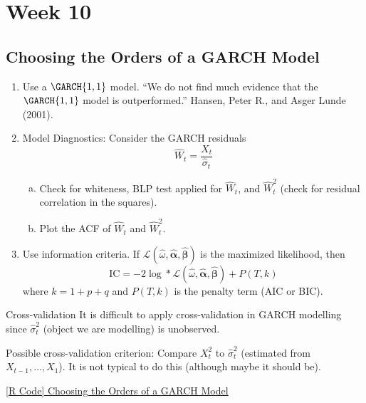 \chapter{Week 10}
\section{Choosing the Orders of a GARCH Model}
\begin{enumerate}[(1)]
    \item Use a $ \GARCH{1,1} $ model. ``We do not find much evidence
          that the $ \GARCH{1,1} $ model is outperformed.'' Hansen, Peter R., and Asger Lunde (2001).
    \item Model Diagnostics: Consider the GARCH residuals
          \[ \hat{W}_t=\frac{X_t}{\hat{\sigma}_t}  \]
          \begin{enumerate}[(a)]
              \item Check for whiteness, BLP test applied for $ \hat{W}_t $,
                    and $ \hat{W}_t^2 $ (check for residual correlation in the squares).
              \item Plot the ACF of $ \hat{W}_t $ and $ \hat{W}_t^2 $.
          \end{enumerate}
    \item Use information criteria. If $ \mathcal{L}(\hat{\omega},\hat{\symbf{\alpha}},\hat{\symbf{\beta}}) $
          is the maximized likelihood, then
          \[ \text{IC}=-2\log*{\mathcal{L}(\hat{\omega},\hat{\symbf{\alpha}},\hat{\symbf{\beta}})}+P(T,k) \]
          where $ k=1+p+q $ and $ P(T,k) $ is the penalty term (AIC or BIC).
\end{enumerate}
\begin{Remark}{Cross-validation}{}
    It is difficult to apply cross-validation in GARCH modelling since
    $ \hat{\sigma}_t^2 $ (object we are modelling) is unobserved.

    \vspace{1mm}

    Possible cross-validation criterion: Compare $ X_t^2 $ to $ \hat{\sigma}_t^2 $
    (estimated from $ X_{t-1},\ldots,X_1 $). It is
    not typical to do this (although maybe it should be).
\end{Remark}
\href{https://github.com/Hextical/university-notes/blob/master/year-3/semester-2/STAT 443/code/10.1 - Choosing the Orders of a GARCH Model.R}{[R Code] Choosing the Orders of a GARCH Model}
